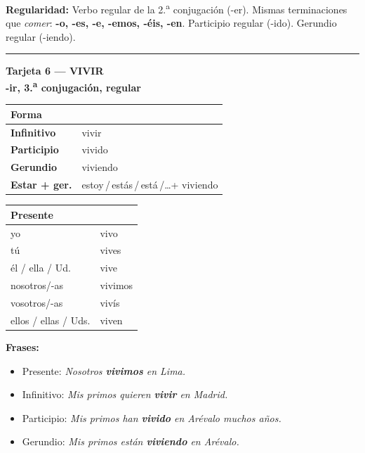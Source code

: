 \documentclass[a4paper,10pt]{article}
\newcommand{\verboheader}[3]{%
  \noindent
  \colorbox{azulverbo!90}{\parbox{\dimexpr\linewidth-2\fboxsep}{%
    \centering\color{white}\bfseries\large Tarjeta #1 --- #2\\[2pt]
    \normalsize #3%
  }}
  \vspace{4pt}
}
\newcommand{\tarjetasep}{%
  \vspace{6pt}
  \noindent\rule{\linewidth}{0.4pt}
  \vspace{6pt}
}
\begin{document}
\begin{trucoverbo}
\textbf{Regularidad:} Verbo regular de la 2.\textsuperscript{a} conjugación (-er). Mismas terminaciones que \textit{comer}: \textbf{-o, -es, -e, -emos, -éis, -en}. Participio regular (-ido). Gerundio regular (-iendo).
\end{trucoverbo}

\tarjetasep

\verboheader{6}{VIVIR}{-ir, 3.\textsuperscript{a} conjugación, regular}

\begin{minipage}[t]{0.48\linewidth}
\small
\begin{tabular}{|>{\bfseries}l|l|}
\hline
\rowcolor{azulverbo!15} Forma & \\
\hline
Infinitivo & vivir \\
\hline
\rowcolor{grisclaro}
Participio & vivido \\
\hline
Gerundio & viviendo \\
\hline
\rowcolor{grisclaro}
Estar + ger. & estoy\,/\,estás\,/\,está\,/\ldots\;+ viviendo \\
\hline
\end{tabular}
\end{minipage}
\hfill
\begin{minipage}[t]{0.48\linewidth}
\small
\begin{tabular}{|l|l|}
\hline
\rowcolor{azulverbo!15} \textbf{Presente} & \\
\hline
yo & vivo \\
\hline
\rowcolor{grisclaro}
tú & vives \\
\hline
él / ella / Ud. & vive \\
\hline
\rowcolor{grisclaro}
nosotros/-as & vivimos \\
\hline
vosotros/-as & vivís \\
\hline
\rowcolor{grisclaro}
ellos / ellas / Uds. & viven \\
\hline
\end{tabular}
\end{minipage}

\vspace{4pt}
\small
\textbf{Frases:}
\begin{itemize}[nosep, leftmargin=1em]
\item Presente: \textit{Nosotros \textbf{vivimos} en Lima.}
\item Infinitivo: \textit{Mis primos quieren \textbf{vivir} en Madrid.}
\item Participio: \textit{Mis primos han \textbf{vivido} en Arévalo muchos años.}
\item Gerundio: \textit{Mis primos están \textbf{viviendo} en Arévalo.}
\end{itemize}
\end{document}
